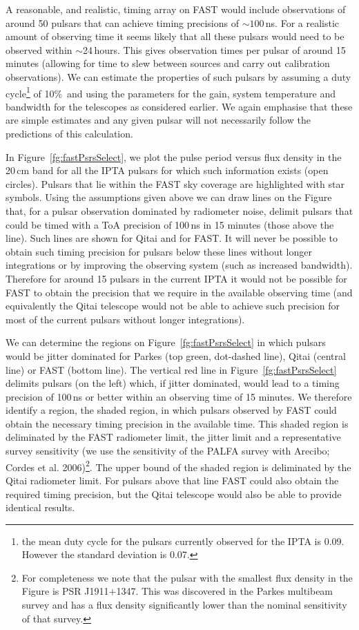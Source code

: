 \documentclass{raa}            %
\begin{document}
A reasonable, and realistic, timing array on FAST would include observations of around 50 pulsars that can achieve timing precisions of $\sim 100$\,ns.  For a realistic amount of observing time it seems likely that all these pulsars would need to be observed within $\sim$24\,hours. This gives observation times per pulsar of around 15 minutes (allowing for time to slew between sources and carry out calibration observations).    We can estimate the properties of such pulsars by assuming a duty cycle\footnote{the mean duty cycle for the pulsars currently observed for the IPTA is 0.09.  However the standard deviation is 0.07.} of 10\%\ and using the parameters for the gain, system temperature and bandwidth for the telescopes as considered earlier.  We again emphasise that these are simple estimates and any given pulsar will not necessarily follow the predictions of this calculation.  

In Figure~\ref{fg:fastPsrsSelect}, we plot the pulse period versus flux density in the 20\,cm band for all the IPTA pulsars for which such information exists (open circles).  Pulsars that lie within the FAST sky coverage are highlighted with star symbols.  Using the assumptions given above we can draw  lines on the Figure that, for a pulsar observation dominated by radiometer noise, delimit pulsars that could be timed with a ToA precision of 100\,ns in 15 minutes (those above the line).  Such lines are shown for Qitai and for FAST.  It will never be possible to obtain such timing precision for pulsars below these lines without longer integrations or by improving the observing system (such as increased bandwidth).  Therefore for around 15 pulsars in the current IPTA it would not be possible for FAST to obtain the precision that we require in the available observing time (and equivalently the Qitai telescope would not be able to achieve such precision for most of the current pulsars without longer integrations).

We can determine the regions on Figure~\ref{fg:fastPsrsSelect} in which pulsars would be jitter dominated for Parkes (top green, dot-dashed line), Qitai (central line) or FAST (bottom line).   The vertical red line in Figure~\ref{fg:fastPsrsSelect} delimits pulsars (on the left) which, if jitter dominated, would lead to a timing precision of 100\,ns or better within an observing time of 15 minutes. We therefore identify a region, the shaded region, in which pulsars observed by FAST could obtain the necessary timing precision in the available time. This shaded region is deliminated by the FAST radiometer limit, the jitter limit and a representative survey sensitivity (we use the sensitivity of the PALFA survey with Arecibo; Cordes et al. 2006\nocite{cfl+06})\footnote{ For completeness we note that the pulsar with the smallest flux density in the Figure is PSR J1911$+$1347.  This was discovered in the Parkes multibeam survey \citep{fsk+04} and has a flux density significantly lower than the nominal sensitivity of that survey.}.  The upper bound of the shaded region is deliminated by the Qitai radiometer limit. For pulsars above that line FAST could also obtain the required timing precision, but the Qitai telescope would also be able to provide identical results.
 
\end{document}
